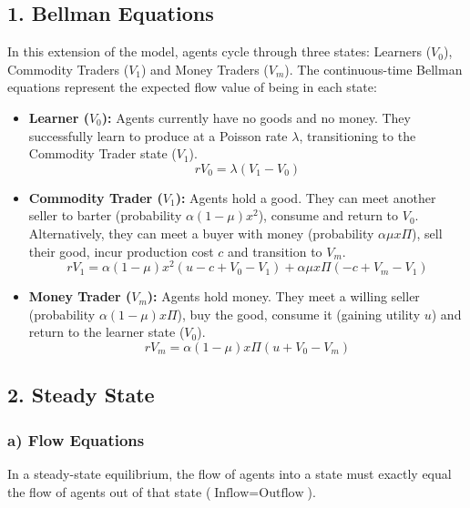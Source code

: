 \documentclass[11pt, a4paper]{article}
\begin{document}
\subsection*{1. Bellman Equations}
In this extension of the model, agents cycle through three states: Learners ($V_0$), Commodity Traders ($V_1$) and Money Traders ($V_m$). The continuous-time Bellman equations represent the expected flow value of being in each state:

\begin{itemize}
    \item \textbf{Learner ($V_0$):} Agents currently have no goods and no money. They successfully learn to produce at a Poisson rate $\lambda$, transitioning to the Commodity Trader state ($V_1$).
    \begin{equation}
        rV_0 = \lambda(V_1 - V_0)
    \end{equation}

    \item \textbf{Commodity Trader ($V_1$):} Agents hold a good. They can meet another seller to barter (probability $\alpha(1-\mu)x^2$), consume and return to $V_0$. Alternatively, they can meet a buyer with money (probability $\alpha\mu x\Pi$), sell their good, incur production cost $c$ and transition to $V_m$.
    \begin{equation}
        rV_1 = \alpha(1-\mu)x^2(u - c + V_0 - V_1) + \alpha\mu x\Pi(-c + V_m - V_1)
    \end{equation}

    \item \textbf{Money Trader ($V_m$):} Agents hold money. They meet a willing seller (probability $\alpha(1-\mu)x\Pi$), buy the good, consume it (gaining utility $u$) and return to the learner state ($V_0$).
    \begin{equation}
        rV_m = \alpha(1-\mu)x\Pi(u + V_0 - V_m)
    \end{equation}
\end{itemize}

\subsection*{2. Steady State}

\subsubsection*{a) Flow Equations}
In a steady-state equilibrium, the flow of agents into a state must exactly equal the flow of agents out of that state ($\text{Inflow} = \text{Outflow}$).
\end{document}
